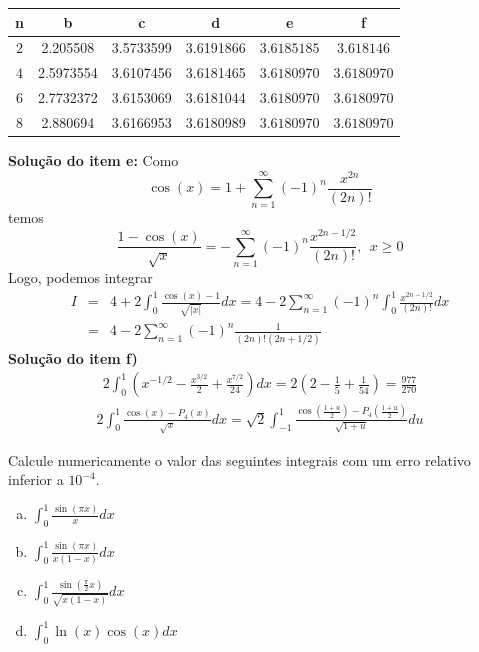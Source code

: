 \begin{resp}
\begin{center}
\begin{tabular}{|c|c|c|c|c|c|}
\hline
n   & b& c&d&e&f\\
\hline
$2$ & 2.205508&  3.5733599 &3.6191866&$3.6185185$&$3.618146$\\
\hline
$4$ &2.5973554&  3.6107456&3.6181465&$3.6180970$&$3.6180970$\\
\hline
$6$ &2.7732372&  3.6153069&3.6181044&$3.6180970$&$3.6180970$\\
\hline
$8$ &2.880694&  3.6166953&3.6180989&$3.6180970$&$3.6180970$\\
\hline
\end{tabular}
\end{center}

{\bf Solução do item e:}
Como \begin{equation} \cos(x)=1+\sum_{n=1}^\infty(-1)^n\frac{x^{2n}}{(2n)!} \end{equation}
temos
\begin{equation} \frac{1-\cos(x)}{\sqrt{x}}=-\sum_{n=1}^\infty(-1)^{n}\frac{x^{2n-1/2}}{(2n)!},~~x\geq0 \end{equation}
Logo, podemos integrar
\begin{eqnarray}
I&=&4+2\int_{0}^1\frac{\cos(x)-1}{\sqrt{|x|}}dx=4-2\sum_{n=1}^\infty(-1)^{n}\int_0^1\frac{x^{2n-1/2}}{(2n)!}dx\\
&=&4-2\sum_{n=1}^\infty(-1)^{n}\frac{1}{(2n)!(2n+1/2)}
\end{eqnarray}
{\bf Solução do item f)}
\begin{eqnarray}2\int_{0}^1\left(x^{-1/2}-\frac{x^{3/2}}{2}+\frac{x^{7/2}}{24}\right)dx=2\left(2-\frac{1}{5}+\frac{1}{54}\right)=\frac{977}{270}
\end{eqnarray}
\begin{eqnarray}2\int_{0}^1\frac{\cos(x)-P_4(x)}{\sqrt{x}}dx=\sqrt{2}\int_{-1}^1\frac{\cos\left(\frac{1+u}{2}\right)-P_4\left(\frac{1+u}{2}\right)}{\sqrt{1+u}}du
\end{eqnarray}
\end{resp}

\begin{exer}Calcule numericamente o valor das seguintes integrais com um erro relativo inferior a $10^{-4}$.
\begin{enumerate}[a)]
\item $\displaystyle\int_0^1\frac{\sin(\pi x)}{x}dx$
\item $\displaystyle\int_0^1\frac{\sin(\pi x)}{x(1-x)}dx$
\item $\displaystyle \int_0^1\frac{\sin\left(\frac{\pi}{2} x\right)}{\sqrt{x(1-x)}}dx$
\item $\displaystyle \int_0^1\ln(x) \cos(x) dx$
\end{enumerate}
\end{exer}

